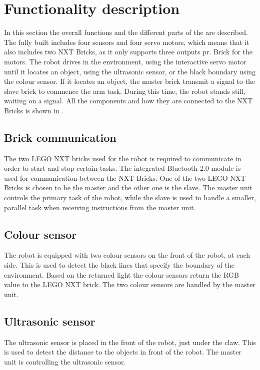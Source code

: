 \section{Functionality description} \label{sec:functionality_description}
In this section the overall functions and the different parts of the \projname{} are described. The fully built \projname{} includes four sensors and four servo motors, which means that it also includes two NXT Bricks, as it only supports three outputs pr. Brick for the motors. The robot drives in the environment, using the interactive servo motor until it locates an object, using the ultrasonic sensor, or the black boundary using the colour sensor. If it locates an object, the master brick transmit a signal to the slave brick to commence the arm task. During this time, the robot stands still, waiting on a signal. All the components and how they are connected to the NXT Bricks is shown in . 

\subsection{Brick communication}
The two LEGO NXT bricks used for the robot is required to communicate in order to start and stop certain tasks. The integrated Bluetooth 2.0 module is used for communication between the NXT Bricks. One of the two LEGO NXT Bricks is chosen to be the master and the other one is the slave. The master unit controls the primary task of the robot, while the slave is used to handle a smaller, parallel task when receiving instructions from the master unit.

\subsection{Colour sensor} 
The robot is equipped with two colour sensors on the front of the robot, at each side. This is used to detect the black lines that specify the boundary of the environment. Based on the returned light the colour sensors return the RGB value to the LEGO NXT brick. The two colour sensors are handled by the master unit. 

\subsection{Ultrasonic sensor}
The ultrasonic sensor is placed in the front of the robot, just under the claw. This is used to detect the distance to the objects in front of the robot. The master unit is controlling the ultrasonic sensor.

